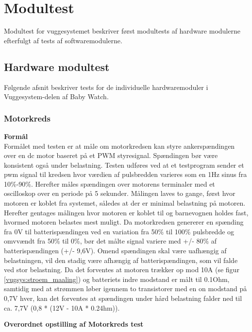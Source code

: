 \section{Modultest}
Modultest for vuggesystemet beskriver først modultests af hardware modulerne efterfulgt af tests af softwaremodulerne. 
\subsection{Hardware modultest}
Følgende afsnit beskriver tests for de individuelle hardwaremoduler i Vuggesystem-delen af Baby Watch.
\subsubsection{Motorkreds}
\textbf{Formål} \\
Formålet med testen er at måle om motorkredsen kan styre ankerspændingen over en dc motor baseret på et PWM styresignal. Spændingen bør være konsistent også under belastning. Testen udføres ved at et testprogram sender et pwm signal til kredsen hvor værdien af pulsbredden varieres som en 1Hz sinus fra 10\%-90\%. Herefter måles spændingen over motorens terminaler med et oscilloskop over en periode på 5 sekunder. Målingen laves to gange, først hvor motoren er koblet fra systemet, således at der er minimal belastning på motoren. Herefter gentages målingen hvor motoren er koblet til og barnevognen holdes fast, hvormed motoren belastes mest muligt. Da motorkredsen genererer en spænding fra 0V til batterispændingen ved en variation fra 50\% til 100\% pulsbredde og omvvændt fra 50\% til 0\%, bør det målte signal variere med +/- 80\% af batterispændingen (+/- 9,6V). Omend spændingen skal være uafhængig af belastningen, vil den stadig være afhængig af batterispændingen, som vil falde ved stor belastning. Da det forventes at motoren trækker op mod 10A (se figur \vref{vugsys:stroem_maaling}) og batteriets indre modstand er målt til 0.1Ohm, samtidig med at strømmen løber igennem to transistorer med en on modstand på 0,7V hver, kan det forventes at spændingen under hård belastning falder ned til ca. 7,7V (0,8 * (12V - 10A * 0.24hm)). 

\textbf{Overordnet opstilling af Motorkreds test}

